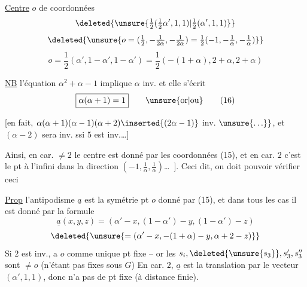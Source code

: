 \uline{Centre} $o$ de coordonnées
\[
\deleted{\unsure{\tfrac12(\tfrac12\alpha',1,1)|\tfrac12(\alpha',1,1)}}
\]
\[
\deleted{\unsure{o=(\tfrac12,-\tfrac1{2\alpha},-\tfrac1{2\alpha})=\tfrac12(-1,-\tfrac1\alpha,-\tfrac1\alpha)}}
\]
\[
o=\frac12(\alpha',1-\alpha',1-\alpha')=\frac12(-(1+\alpha),2+\alpha,2+\alpha)\tag*{(15)}
\]

\uline{NB} l'équation $\alpha^2+\alpha-1$ implique $\alpha$ inv. et  elle s'écrit
\[
\boxed{\alpha(\alpha+1)=1}\qquad\unsure{\text{or}|\text{ou}}\tag*{(16)}
\]

[en fait, $\alpha(\alpha+1)(\alpha-1)(\alpha+2)\inserted{(2\alpha-1)}$  inv. $\unsure{\ldots\}}$, et $(\alpha-2)$ sera inv. ssi $5$ est inv.\dots]

Ainsi, en car. $\ne2$ le centre est donné par les coordonnées (15), et en car. $2$ c'est  le pt à l'infini dans la direction $(-1,\frac1\alpha,\frac1\alpha)$\dots\ ].
Ceci dit, on doit pouvoir  vérifier ceci

\uline{Prop} l'antipodisme $\underline{a}$ est la symétrie  pt $o$ donné par (15), et dans tous les cas il est donné par la formule
\[
\underline{a}(x,y,z)=(\alpha'-x,(1-\alpha')-y,(1-\alpha')-z)\tag*{(17)}
\]
\[
\deleted{\unsure{=(\alpha'-x,-(1+\alpha)-y,\alpha+2-z)}}
\]
Si $2$ est inv.,  a $o$ comme unique pt fixe -- or les $s_i,\deleted{\unsure{s_3}},s'_3,s''_3$ sont $\ne o$ (n'étant pas fixes sous $G$) En car.  $2$, $\underline{a}$ est la translation par le vecteur $(\alpha',1,1)$, donc n'a pas de pt fixe (à distance finie).

